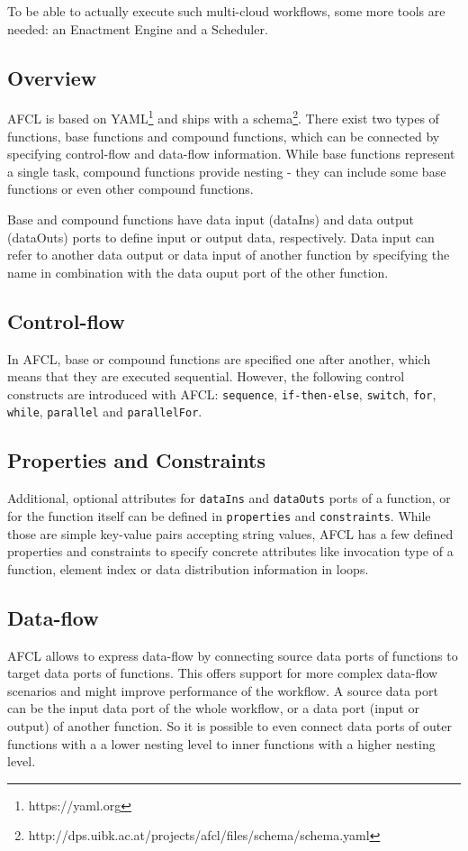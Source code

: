 \documentclass[a4paper,top=25mm,bottom=25mm,12pt,pdftex,halfparskip,twoside,bibtotoc,numbers=noenddot]{scrbook}
\begin{document}
To be able to actually execute such multi-cloud workflows, some more tools are needed: an Enactment Engine and a Scheduler.

\subsection{Overview}
AFCL is based on YAML\footnote{https://yaml.org} and ships with a schema\footnote{http://dps.uibk.ac.at/projects/afcl/files/schema/schema.yaml}. There exist two types of functions, base functions and compound functions, which can be connected by specifying control-flow and data-flow information. While base functions represent a single task, compound functions provide nesting - they can include some base functions or even other compound functions.

Base and compound functions have data input (dataIns) and data output (dataOuts) ports to define input or output data, respectively.
Data input can refer to another data output or data input of another function by specifying the name in combination with the data ouput port of the other function.

\subsection{Control-flow}
In AFCL, base or compound functions are specified one after another, which means that they are executed sequential. However, the following control constructs are introduced with AFCL: \texttt{sequence}, \texttt{if-then-else}, \texttt{switch}, \texttt{for}, \texttt{while}, \texttt{parallel} and \texttt{parallelFor}.


\subsection{Properties and Constraints}

Additional, optional attributes for \texttt{dataIns} and \texttt{dataOuts} ports of a function, or for the function itself can be defined in \texttt{properties} and \texttt{constraints}. While those are simple key-value pairs accepting string values, AFCL has a few defined properties and constraints to specify concrete attributes like invocation type of a function, element index or data distribution information in loops.

\subsection{Data-flow}
AFCL allows to express data-flow by connecting source data ports of functions to target data ports of functions. This offers support for more complex data-flow scenarios and might improve performance of the workflow. A source data port can be the input data port of the whole workflow, or a data port (input or output) of another function. So it is possible to even connect data ports of outer functions with a a lower nesting level to inner functions with a higher nesting level. 
\end{document}
